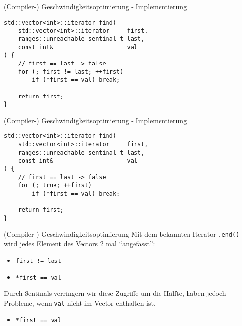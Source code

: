 \begin{frame}[fragile]{(Compiler-) Geschwindigkeitsoptimierung - Implementierung}
    \begin{verbatim}
std::vector<int>::iterator find(
    std::vector<int>::iterator     first,
    ranges::unreachable_sentinal_t last,
    const int&                     val
) {
    // first == last -> false
    for (; first != last; ++first)
        if (*first == val) break;
    
    return first;
}
    \end{verbatim}
\end{frame}

\begin{frame}[fragile]{(Compiler-) Geschwindigkeitsoptimierung - Implementierung}
    \begin{verbatim}
std::vector<int>::iterator find(
    std::vector<int>::iterator     first,
    ranges::unreachable_sentinal_t last,
    const int&                     val
) {
    // first == last -> false
    for (; true; ++first)
        if (*first == val) break;
    
    return first;
}
    \end{verbatim}
\end{frame}

\begin{frame}[fragile]{(Compiler-) Geschwindigkeitsoptimierung}
    Mit dem bekannten Iterator \texttt{.end()} wird jedes Element des Vectors 2 mal \enquote{angefasst}:
    \begin{itemize}
        \item \texttt{first != last}
        \item \texttt{*first == val}
    \end{itemize}

    \vspace{2.5em}

    Durch Sentinals verringern wir diese Zugriffe um die Hälfte, haben jedoch Probleme, wenn \texttt{val} nicht im Vector enthalten ist.
    \begin{itemize}
        \item \texttt{*first == val}
    \end{itemize}
\end{frame}
